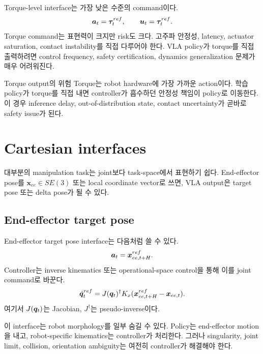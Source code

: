 Torque-level interface는 가장 낮은 수준의 command이다.
\begin{equation}
  \bm{a}_t = \bm{\tau}^{ref}_t,
  \qquad
  \bm{u}_t = \bm{\tau}^{ref}_t.
  \label{eq:torque-interface}
\end{equation}
Torque command는 표현력이 크지만 risk도 크다. 고주파 안정성, latency, actuator saturation, contact instability를 직접 다루어야 한다. VLA policy가 torque를 직접 출력하려면 control frequency, safety certification, dynamics generalization 문제가 매우 어려워진다.

\begin{warningbox}{Torque output의 위험}
Torque는 robot hardware에 가장 가까운 action이다. 학습 policy가 torque를 직접 내면 controller가 흡수하던 안정성 책임이 policy로 이동한다. 이 경우 inference delay, out-of-distribution state, contact uncertainty가 곧바로 safety issue가 된다.
\end{warningbox}

\section{Cartesian interfaces}

대부분의 manipulation task는 joint보다 task-space에서 표현하기 쉽다. End-effector pose를 $\bm{x}_{ee}\in SE(3)$ 또는 local coordinate vector로 쓰면, VLA output은 target pose 또는 delta pose가 될 수 있다.

\subsection{End-effector target pose}

End-effector target pose interface는 다음처럼 쓸 수 있다.
\begin{equation}
  \bm{a}_t = \bm{x}^{ref}_{ee,t+H}.
  \label{eq:ee-target}
\end{equation}
Controller는 inverse kinematics 또는 operational-space control을 통해 이를 joint command로 바꾼다.
\begin{equation}
  \dot{\bm{q}}^{ref}_t
  = J(\bm{q}_t)^\dagger
  K_x(\bm{x}^{ref}_{ee,t+H}-\bm{x}_{ee,t}).
  \label{eq:ik-command}
\end{equation}
여기서 $J(\bm{q}_t)$는 Jacobian, $J^\dagger$는 pseudo-inverse이다.

이 interface는 robot morphology를 일부 숨길 수 있다. Policy는 end-effector motion을 내고, robot-specific kinematics는 controller가 처리한다. 그러나 singularity, joint limit, collision, orientation ambiguity는 여전히 controller가 해결해야 한다.

